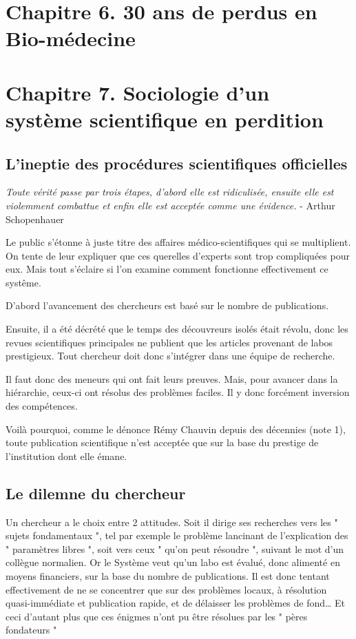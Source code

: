 \documentclass[a4paper,12pt]{article}
\begin{document}
\section{Chapitre 6. 30 ans de perdus en Bio-médecine}







\section{Chapitre 7. Sociologie d'un système scientifique en perdition}

\subsection {L’ineptie des procédures scientifiques officielles}

\textit{Toute vérité passe par trois étapes, d'abord elle est ridiculisée, ensuite elle est violemment combattue et enfin elle est acceptée comme une évidence.}
- Arthur Schopenhauer
      
    Le public s’étonne à juste titre des affaires médico-scientifiques qui se multiplient. On tente de leur expliquer que ces querelles d’experts sont trop compliquées pour eux. Mais tout s’éclaire si l’on examine comment fonctionne effectivement ce syst\^eme.

D’abord l’avancement des chercheurs est basé sur le nombre de publications.

Ensuite, il a été décrété que le temps des découvreurs isolés était révolu, donc les revues scientifiques principales ne publient que les articles provenant de labos prestigieux. Tout chercheur doit donc s’intégrer dans une équipe de recherche. 

Il faut donc des meneurs qui ont fait leurs preuves. Mais, pour avancer dans la hiérarchie, ceux-ci ont résolus des problèmes faciles. Il y donc forcément inversion des compétences. 

Voilà pourquoi, comme le dénonce Rémy Chauvin depuis des décennies (note 1), toute publication scientifique n’est acceptée que sur la base du prestige de l’institution dont elle émane. 


\subsection {Le dilemne du chercheur}
Un chercheur a le choix entre 2 attitudes. Soit il dirige ses recherches vers les " sujets fondamentaux ", tel par exemple le problème lancinant de l’explication des " paramètres libres ", soit vers ceux " qu’on peut résoudre ", suivant le mot d’un collègue normalien. Or le Système veut qu’un labo est évalué, donc alimenté en moyens financiers, sur la base du nombre de publications. Il est donc tentant effectivement de ne se concentrer que sur des problèmes locaux, à résolution quasi-immédiate et publication rapide, et de délaisser les problèmes de fond… Et ceci d’autant plus que ces énigmes n’ont pu être résolues par les " pères fondateurs " 
\end{document}
